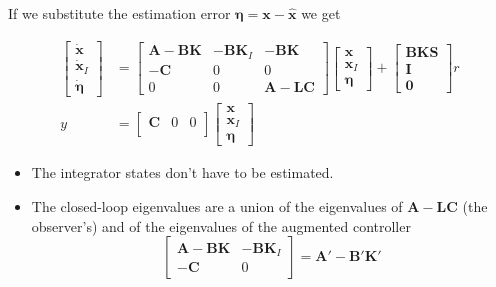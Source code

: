If we substitute the estimation error $\bm{\eta}=\textbf{x}-\hat{\textbf{x}}$ we get

\begin{align*}
    \begin{bmatrix}
        \dot{\mathbf{x}}   \\
        \dot{\mathbf{x}}_I \\
        \dot{\bm{\eta}}
    \end{bmatrix}
      & =
    \begin{bmatrix}
        \mathbf{A-BK} & \mathbf{-BK}_I & \mathbf{-BK}  \\
        \mathbf{-C}   & 0              & 0             \\
        0             & 0              & \mathbf{A-LC}
    \end{bmatrix}
    \begin{bmatrix}
        \mathbf{x}   \\
        \mathbf{x}_I \\
        \bm{\eta}
    \end{bmatrix}
    +
    \begin{bmatrix}
        \mathbf{BKS} \\
        \mathbf{I}   \\
        \mathbf{0}
    \end{bmatrix}
    r                        \\
    y & = \begin{bmatrix}
              \mathbf{C} & 0 & 0 \\
          \end{bmatrix}
    \begin{bmatrix}
        \mathbf{x}   \\
        \mathbf{x}_I \\
        \bm{\eta}
    \end{bmatrix}
\end{align*}

\newpar{}
\begin{itemize}
    \item The integrator states don't have to be estimated.
    \item The closed-loop eigenvalues are a union of the eigenvalues of $\mathbf{A-LC}$ (the observer's) and of the eigenvalues of the augmented controller \begin{equation*}
              \begin{bmatrix}
                  \mathbf{A-BK} & \mathbf{-BK}_I \\
                  \mathbf{-C}   & 0
              \end{bmatrix}
              = \mathbf{A'-B'K'}
          \end{equation*}
\end{itemize}

